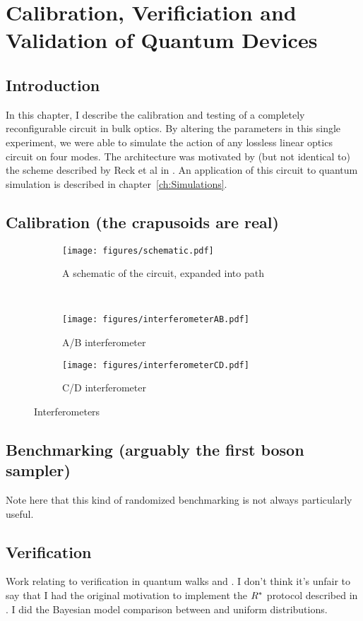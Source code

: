 \chapter{Calibration, Verificiation and Validation of Quantum Devices}
\label{ch:QCVV}

\section{Introduction}
\label{sec:QCVVIntro}
In this chapter, I describe the calibration and testing of a completely
reconfigurable circuit in bulk optics. By altering the parameters in this single
experiment, we were able to simulate the action of any lossless linear optics
circuit on four modes. The architecture was motivated by (but not identical to)
the scheme described by Reck et al in \cite{reck94}. An application of this
circuit to quantum simulation is described in chapter~\ref{ch:Simulations}.

\section{Calibration (the crapusoids are real)}
\label{sec:Calibration}
\begin{figure}
  \centering
  \begin{subfigure}{\textwidth}
    \texttt{[image: figures/schematic.pdf]}
    \caption{A schematic of the circuit, expanded into path}
    \label{fig:schematic}
  \end{subfigure} \\
  \vspace{1cm}
  \begin{subfigure}{0.45\textwidth}
    \texttt{[image: figures/interferometerAB.pdf]}
    \caption{A/B interferometer}
    \label{fig:ab}
  \end{subfigure}
  \hspace{0.05\textwidth}
  \begin{subfigure}{0.45\textwidth}
    \texttt{[image: figures/interferometerCD.pdf]}
    \caption{C/D interferometer}
    \label{fig:cd}
  \end{subfigure}
  \caption[Illustration of nested interferometers in the bulk Reck scheme]
  {Interferometers}
  \label{fig:interferometers}
\end{figure}

\section{Benchmarking (arguably the first boson sampler)}
\label{sec:Benchmarking}
Note here that this kind of randomized benchmarking is not always particularly
useful.

\section{Verification}
\label{sec:Verification}
Work relating to verification in quantum walks and \bosonsampling{}. I don't
think it's unfair to say that I had the original motivation to implement the
\(R^{*}\) protocol described in \cite{aaronson13}. I did the Bayesian model
comparison between \bosonsampling{} and uniform distributions.
